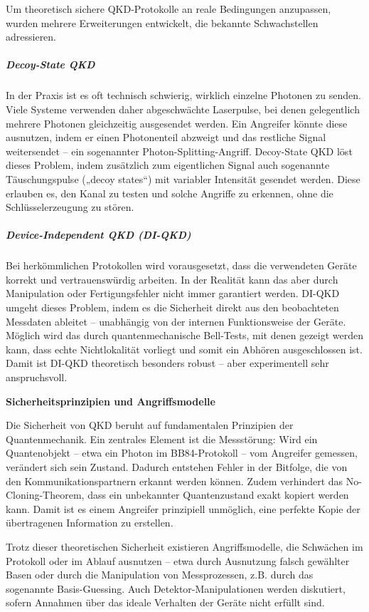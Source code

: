 \noindent
Um theoretisch sichere QKD-Protokolle an reale Bedingungen anzupassen, wurden mehrere Erweiterungen entwickelt, die bekannte Schwachstellen adressieren.
\subparagraph{Decoy-State QKD}
In der Praxis ist es oft technisch schwierig, wirklich einzelne Photonen zu senden. Viele Systeme verwenden daher abgeschwächte Laserpulse, bei denen gelegentlich mehrere Photonen gleichzeitig ausgesendet werden. Ein Angreifer könnte diese ausnutzen, indem er einen Photonenteil abzweigt und das restliche Signal weitersendet – ein sogenannter Photon-Splitting-Angriff.
Decoy-State QKD löst dieses Problem, indem zusätzlich zum eigentlichen Signal auch sogenannte Täuschungspulse („decoy states“) mit variabler Intensität gesendet werden. Diese erlauben es, den Kanal zu testen und solche Angriffe zu erkennen, ohne die Schlüsselerzeugung zu stören. \cite{scarani_et_al_security_2009}
 
\subparagraph{Device-Independent QKD (DI-QKD)}
Bei herkömmlichen Protokollen wird vorausgesetzt, dass die verwendeten Geräte korrekt und vertrauenswürdig arbeiten. In der Realität kann das aber durch Manipulation oder Fertigungsfehler nicht immer garantiert werden.
DI-QKD umgeht dieses Problem, indem es die Sicherheit direkt aus den beobachteten Messdaten ableitet – unabhängig von der internen Funktionsweise der Geräte. Möglich wird das durch quantenmechanische Bell-Tests, mit denen gezeigt werden kann, dass echte Nichtlokalität vorliegt und somit ein Abhören ausgeschlossen ist. Damit ist DI-QKD theoretisch besonders robust – aber experimentell sehr anspruchsvoll. \cite{scarani_et_al_security_2009}

\vspace{1em}
\noindent\textbf{Sicherheitsprinzipien und Angriffsmodelle}

\noindent
Die Sicherheit von QKD beruht auf fundamentalen Prinzipien der Quantenmechanik. Ein zentrales Element ist die Messstörung: Wird ein Quantenobjekt – etwa ein Photon im BB84-Protokoll – vom Angreifer gemessen, verändert sich sein Zustand. Dadurch entstehen Fehler in der Bitfolge, die von den Kommunikationspartnern erkannt werden können. Zudem verhindert das No-Cloning-Theorem, dass ein unbekannter Quantenzustand exakt kopiert werden kann. Damit ist es einem Angreifer prinzipiell unmöglich, eine perfekte Kopie der übertragenen Information zu erstellen. \cite{scarani_et_al_security_2009}

\noindent
Trotz dieser theoretischen Sicherheit existieren Angriffsmodelle, die Schwächen im Protokoll oder im Ablauf ausnutzen – etwa durch Ausnutzung falsch gewählter Basen oder durch die Manipulation von Messprozessen, z.B. durch das sogenannte Basis-Guessing. Auch Detektor-Manipulationen werden diskutiert, sofern Annahmen über das ideale Verhalten der Geräte nicht erfüllt sind. \cite{scarani_et_al_security_2009}

